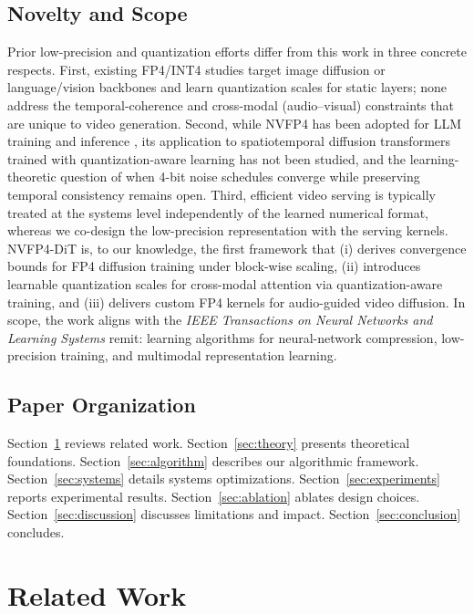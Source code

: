 \documentclass[journal,twoside]{IEEEtran}
\theoremstyle{definition}
\theoremstyle{remark}
\begin{document}
\subsection{Novelty and Scope}
Prior low-precision and quantization efforts differ from this work in three concrete respects. First, existing FP4/INT4 studies target image diffusion or language/vision backbones \cite{zhao2023fp4, li2023efficientdm, bondarenko2024understanding} and learn quantization scales for static layers; none address the temporal-coherence and cross-modal (audio--visual) constraints that are unique to video generation. Second, while NVFP4 has been adopted for LLM training and inference \cite{nvidia2024nvfp4, dettmers2023qlora}, its application to spatiotemporal diffusion transformers trained with quantization-aware learning has not been studied, and the learning-theoretic question of when 4-bit noise schedules converge while preserving temporal consistency remains open. Third, efficient video serving is typically treated at the systems level \cite{kwon2023efficient, nvidia2024tensorrt} independently of the learned numerical format, whereas we co-design the low-precision representation with the serving kernels. NVFP4-DiT is, to our knowledge, the first framework that (i) derives convergence bounds for FP4 diffusion training under block-wise scaling, (ii) introduces learnable quantization scales for cross-modal attention via quantization-aware training, and (iii) delivers custom FP4 kernels for audio-guided video diffusion. In scope, the work aligns with the \textit{IEEE Transactions on Neural Networks and Learning Systems} remit: learning algorithms for neural-network compression, low-precision training, and multimodal representation learning.

\subsection{Paper Organization}
Section~\ref{sec:related} reviews related work. Section~\ref{sec:theory} presents theoretical foundations. Section~\ref{sec:algorithm} describes our algorithmic framework. Section~\ref{sec:systems} details systems optimizations. Section~\ref{sec:experiments} reports experimental results. Section~\ref{sec:ablation} ablates design choices. Section~\ref{sec:discussion} discusses limitations and impact. Section~\ref{sec:conclusion} concludes.

\section{Related Work}
\label{sec:related}
\end{document}
